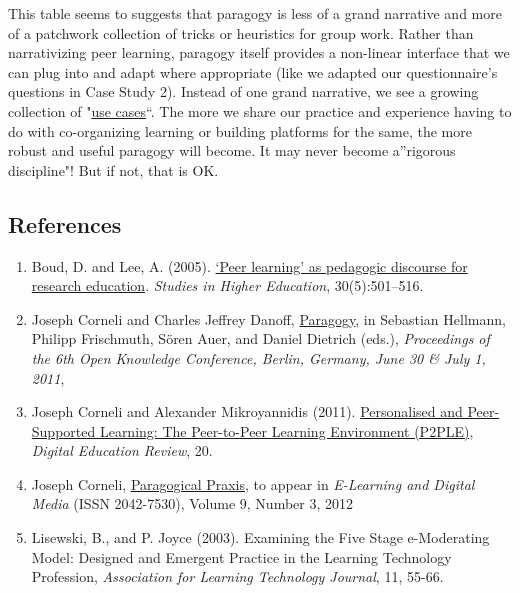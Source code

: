 This table seems to suggests that paragogy is less of a grand narrative
and more of a patchwork collection of tricks or heuristics for group
work. Rather than narrativizing peer learning, paragogy itself provides
a non-linear interface that we can plug into and adapt where appropriate
(like we adapted our questionnaire's questions in Case Study 2). Instead
of one grand narrative, we see a growing collection of
"\href{http://socialmediaclassroom.com/host/peeragogy/wiki/patterns-and-use-cases}{use
cases}``. The more we share our practice and experience having to do
with co-organizing learning or building platforms for the same, the more
robust and useful paragogy will become. It may never become a''rigorous
discipline"! But if not, that is OK.

\subsection{References}

\begin{enumerate}
\item
  Boud, D. and Lee, A. (2005).
  \href{http://manainkblog.typepad.com/faultlines/files/BoudLee2005.pdf}{`Peer
  learning' as pedagogic discourse for research education}.
  \emph{Studies in Higher Education}, 30(5):501--516.
\item
  Joseph Corneli and Charles Jeffrey Danoff,
  \href{http://ceur-ws.org/Vol-739/paper\_5.pdf}{Paragogy}, in Sebastian
  Hellmann, Philipp Frischmuth, Sören Auer, and Daniel Dietrich (eds.),
  \emph{Proceedings of the 6th Open Knowledge Conference, Berlin,
  Germany, June 30 \& July 1, 2011},
\item
  Joseph Corneli and Alexander Mikroyannidis (2011).
  \href{http://greav.ub.edu/der/index.php/der/article/view/188/330}{Personalised
  and Peer-Supported Learning: The Peer-to-Peer Learning Environment
  (P2PLE)}, \emph{Digital Education Review}, 20.
\item
  Joseph Corneli,
  \href{http://paragogy.net/ParagogicalPraxisPaper}{Paragogical Praxis},
  to appear in \emph{E-Learning and Digital Media} (ISSN 2042-7530),
  Volume 9, Number 3, 2012
\item
  Lisewski, B., and P. Joyce (2003). Examining the Five Stage
  e-Moderating Model: Designed and Emergent Practice in the Learning
  Technology Profession, \emph{Association for Learning Technology
  Journal}, 11, 55-66.
\end{enumerate}
